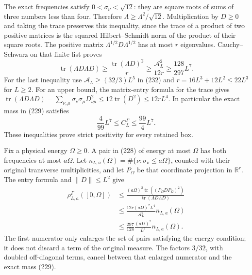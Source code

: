 \documentclass[
  11pt,
]{article}
\begin{document}
The exact frequencies satisfy \(0<\sigma_\nu<\sqrt{12}\): they are
square roots of sums of three numbers less than four. Therefore
\(\Lambda\ge\Lambda^2/\sqrt{12}\). Multiplication by \(D\ge0\) and
taking the trace preserves this inequality, since the trace of a product
of two positive matrices is the squared Hilbert--Schmidt norm of the
product of their square roots. The positive matrix
\(\Lambda^{1/2}D\Lambda^{1/2}\) has at most \(r\) eigenvalues.
Cauchy--Schwarz on that finite list proves \[
 \operatorname{tr}(\Lambda D\Lambda D)
 \ge\frac{\operatorname{tr}(\Lambda D)^2}{r}
 \ge\frac{\mathcal A_L^2}{12r}
 \ge\frac{128}{297}L^7.
 \tag{233}
\] For the last inequality use \(\mathcal A_L\ge(32/3)L^5\) in (232) and
\(r=16L^3+12L^2\le22L^3\) for \(L\ge2\). For an upper bound, the
matrix-entry formula for the trace gives
\(\operatorname{tr}(\Lambda D\Lambda D)
=\sum_{\nu,\mu}\sigma_\nu\sigma_\mu D_{\nu\mu}^2
\le12\operatorname{tr}(D^2)\le12rL^4\). In particular the exact mass in
(229) satisfies \[
 \frac4{99}L^7\le C_L^\Gamma\le\frac{99}{4}L^7 .
 \tag{234}
\] These inequalities prove strict positivity for every retained box.

Fix a physical energy \(\Omega\ge0\). A pair in (228) of energy at most
\(\Omega\) has both frequencies at most \(a\Omega\). Let
\(n_{L,a}(\Omega)=\#\{\nu:\sigma_\nu\le a\Omega\}\), counted with their
original transverse multiplicities, and let \(P_\Omega\) be that
coordinate projection in \(\mathbb R^r\). The entry formula and
\(\|D\|\le L^2\) give \[
 \begin{split}
 \rho_{L,a}^{\Gamma}([0,\Omega])
 &\le\frac{(a\Omega)^2
          \operatorname{tr}((P_\Omega D P_\Omega)^2)}
              {\operatorname{tr}(\Lambda D\Lambda D)}\\
 &\le\frac{12r(a\Omega)^2L^4}{\mathcal A_L^2}
                     n_{L,a}(\Omega)\\
 &\le\frac{297}{128}\frac{(a\Omega)^2}{L^3}
                     n_{L,a}(\Omega).
 \end{split}
 \tag{235}
\] The first numerator only enlarges the set of pairs satisfying the
energy condition; it does not discard a term of the original measure.
The factors \(3/32\), with doubled off-diagonal terms, cancel between
that enlarged numerator and the exact mass (229).
\end{document}

